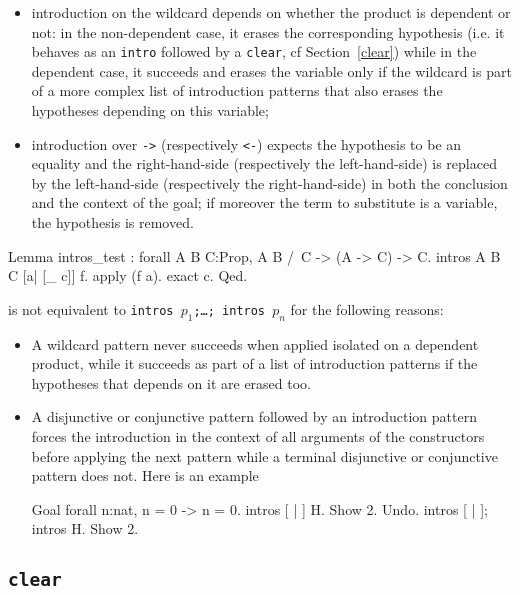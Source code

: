 \begin{coq_example*}
\begin{itemize}
  hypothesis with type {\tt A\verb|/\|exists x, B\verb|/\|C\verb|/\|D} can be
  introduced via pattern {\tt (a \& x \& b \& c \& d)};
\item introduction on the wildcard depends on whether the product is
  dependent or not: in the non-dependent case, it erases the
  corresponding hypothesis (i.e. it behaves as an {\tt intro} followed
  by a {\tt clear}, cf Section~\ref{clear}) while in the dependent
  case, it succeeds and erases the variable only if the wildcard is
  part of a more complex list of introduction patterns that also
  erases the hypotheses depending on this variable;
\item introduction over {\tt ->} (respectively {\tt <-}) expects the
  hypothesis to be an equality and the right-hand-side (respectively
  the left-hand-side) is replaced by the left-hand-side (respectively
  the right-hand-side) in both the conclusion and the context of the goal;
  if moreover the term to substitute is a variable, the hypothesis is
  removed.
\end{itemize}

\Example

\begin{coq_example}
Lemma intros_test : forall A B C:Prop, A \/ B /\ C -> (A -> C) -> C.
intros A B C [a| [_ c]] f.
apply (f a).
exact c.
Qed.
\end{coq_example}

 is not equivalent to \texttt{intros
  $p_1$;\ldots; intros $p_n$} for the following reasons:
\begin{itemize}
\item A wildcard pattern never succeeds when applied isolated on a
  dependent product, while it succeeds as part of a list of
  introduction patterns if the hypotheses that depends on it are
  erased too.
\item A disjunctive or conjunctive pattern followed by an introduction
  pattern forces the introduction in the context of all arguments of
  the constructors before applying the next pattern while a terminal
  disjunctive or conjunctive pattern does not. Here is an example

\begin{coq_example}
Goal forall n:nat, n = 0 -> n = 0.
intros [ | ] H.
Show 2.
Undo.
intros [ | ]; intros H.
Show 2.
\end{coq_example}

\end{itemize}

\subsection{\tt clear \ident}
\label{clear}


\end{coq_example*}

